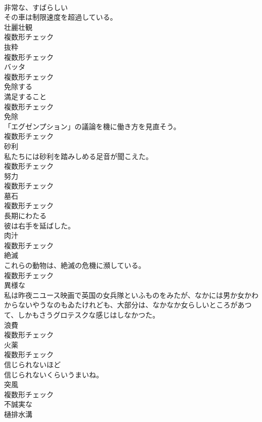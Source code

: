 \documentclass[8pt]{extreport}
\begin{document}
\begin{CJK}{UTF8}{min}
\\	[形容詞]	非常な、すばらしい	
\\	その車は制限速度を超過している。	
\\	[名詞]	壮麗壮観	
\\	複数形チェック
\\	[名詞]	抜粋	
\\	複数形チェック
\\	[名詞]	バッタ	
\\	複数形チェック
\\	[動詞]	免除する	
\\	[名詞]	満足すること	
\\	複数形チェック
\\	[名詞]	免除	
\\	「エグゼンプション」の議論を機に働き方を見直そう。	
\\	複数形チェック
\\	[名詞]	砂利	
\\	私たちには砂利を踏みしめる足音が聞こえた。	
\\	複数形チェック
\\	[名詞]	努力	
\\	複数形チェック
\\	[名詞]	墓石	
\\	複数形チェック
\\	[形容詞]	⻑期にわたる	
\\	彼は右手を延ばした。	
\\	[名詞]	肉汁	
\\	複数形チェック
\\	[名詞]	絶滅	
\\	これらの動物は、絶滅の危機に瀕している。	
\\	複数形チェック
\\	[形容詞]	異様な	
\\	私は昨夜ニユース映画で英国の女兵隊といふものをみたが、なかには男か女かわからないやうなのもゐたけれども、大部分は、なかなか女らしいところがあつて、しかもさうグロテスクな感じはしなかつた。	
\\	[名詞]	浪費	
\\	複数形チェック
\\	[名詞]	火薬	
\\	複数形チェック
\\	[形容詞]	信じられないほど	
\\	信じられないくらいうまいね。	
\\	[名詞]	突風	
\\	複数形チェック
\\	[形容詞]	不誠実な	
\\	[名詞]	樋排水溝	

\end{CJK}
\end{document}
